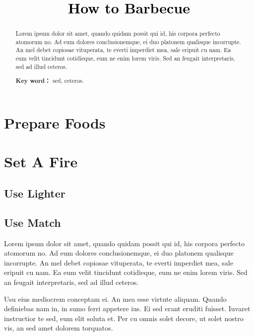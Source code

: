 \documentclass[a4paper,twoside]{article}
\newcommand{\PaperTitle}{How to Barbecue}  %
\begin{document}
\newpage

\title{
	\Large{\textcolor{black}{\PaperTitle}}
}
	
	
\maketitle
	
\tableofcontents
 
\newpage
\thispagestyle{empty}

\begin{abstract}
Lorem ipsum dolor sit amet, quando quidam possit qui id, his corpora perfecto atomorum no. Ad eum dolores conclusionemque, ei duo platonem qualisque incorrupte. An mel debet copiosae vituperata, te everti imperdiet mea, sale eripuit cu nam. Ea eum velit tincidunt cotidieque, eum ne enim lorem viris. Sed an feugait interpretaris, sed ad illud ceteros. 

\par\textbf{Key word：} sed, ceteros. 

\end{abstract}

\newpage
\setcounter{page}{1}

\section{Prepare Foods}

\section{Set A Fire}

\subsection{Use Lighter}
\subsection{Use Match}

Lorem ipsum dolor sit amet, quando quidam possit qui id, his corpora perfecto atomorum no. Ad eum dolores conclusionemque, ei duo platonem qualisque incorrupte. An mel debet copiosae vituperata, te everti imperdiet mea, sale eripuit cu nam. Ea eum velit tincidunt cotidieque, eum ne enim lorem viris. Sed an feugait interpretaris, sed ad illud ceteros.

Usu eius mediocrem conceptam ei. An mea esse virtute aliquam. Quando definiebas nam in, in sumo ferri appetere ius. Ei sed erant eruditi fuisset. Iuvaret instructior te sed, eum elit soluta et. Per cu omnis solet decore, ut solet nostro vis, an sed amet dolorem torquatos.
\end{document}
